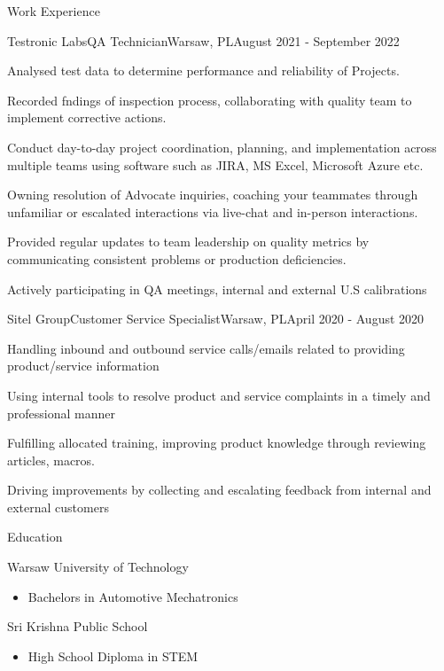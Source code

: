 \documentclass{article}
\newlength{\tabin}
\newlength{\secsep}
\newcommand{\lineunder}{\vspace*{-8pt} \\ \hspace*{-6pt} \hrulefill \\ \vspace*{-15pt}}
\newenvironment{tabbedsection}[1]{
  \begin{list}{}{
      \setlength{\itemsep}{0pt}
      \setlength{\labelsep}{0pt}
      \setlength{\labelwidth}{0pt}
      \setlength{\leftmargin}{\tabin}
      \setlength{\rightmargin}{\tabin}
      \setlength{\listparindent}{0pt}
      \setlength{\parsep}{0pt}
      \setlength{\parskip}{0pt}
      \setlength{\partopsep}{0pt}
      \setlength{\topsep}{#1}
    }
  \item[]
}{\end{list}}
\newenvironment{resume_section}[1]{
  \filbreak
  \vspace{2\secsep}
  \textsc{\large#1}
  \lineunder
  \begin{tabbedsection}{\secsep}
}{\end{tabbedsection}}
\newenvironment{resume_subsection}[2][]{
  \textbf{#2} \hfill {\footnotesize #1} \hspace{2em}
  \begin{tabbedsection}{0.5\secsep}
}{\end{tabbedsection}}
\newenvironment{subitems}{
  \renewcommand{\labelitemi}{-}
  \begin{itemize}
      \setlength{\labelsep}{1em}
}{\end{itemize}}
\newenvironment{resume_employer}[4]{
  \vspace{\secsep}
  \textbf{#1} \\ 
  \indent {\small #2} \hfill {\footnotesize#3 (#4)}
  \begin{tabbedsection}{0pt}
  \begin{subitems}
}{\end{subitems}\end{tabbedsection}}
\begin{document}
\begin{resume_section}{Work Experience}
\begin{resume_employer}{Testronic Labs}{QA Technician}{Warsaw, PL}{August
2021 - September 2022}
\item Analysed test data to determine performance and reliability of Projects. 
\item Recorded fndings of inspection process, collaborating with quality team to implement corrective actions.
\item Conduct day-to-day project coordination, planning, and implementation across multiple teams using software such as JIRA, MS Excel, Microsoft Azure etc.
\item Owning resolution of Advocate inquiries, coaching your teammates through unfamiliar or escalated interactions via live-chat and in-person interactions.
\item Provided regular updates to team leadership on quality metrics by communicating consistent problems or production deficiencies.
\item Actively participating in QA meetings, internal and external U.S calibrations \end{resume_employer}
\begin{resume_employer}{Sitel Group}{Customer Service Specialist}{Warsaw, PL}{April 2020 - August 2020}
\item Handling inbound and outbound service calls/emails related to providing product/service information
\item Using internal tools to resolve product and service complaints in a timely and professional manner
\item Fulfilling allocated training, improving product knowledge through reviewing articles, macros.
\item Driving improvements by collecting and escalating feedback from internal and external customers
\end{resume_employer} \end{resume_section}
\begin{resume_section}{Education} \begin{resume_subsection}{Warsaw
University of Technology} \begin{subitems}
\item Bachelors in Automotive Mechatronics \end{subitems}
\end{resume_subsection}
\begin{resume_subsection}{Sri Krishna Public School}
\begin{subitems}
\item High School Diploma in STEM
\end{subitems} \end{resume_subsection}
\end{resume_section}
\end{document}
